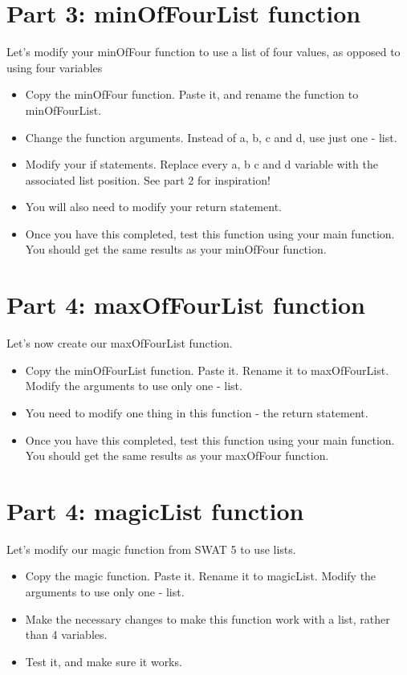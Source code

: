 \documentclass{article}
\begin{document}
\section*{Part 3: minOfFourList function}
Let's modify your minOfFour function to use a list of four values, as opposed to using four variables
\begin{itemize}
    \item Copy the minOfFour function.  Paste it, and rename the function to minOfFourList.
    \item Change the function arguments.  Instead of a, b, c and d, use just one - list.
    \item Modify your if statements.  Replace every a, b c and d variable with the associated list position.  See part 2 for inspiration!
    \item You will also need to modify your return statement.
    \item Once you have this completed, test this function using your main function.  You should get the same results as your minOfFour function.
\end{itemize}

\section*{Part 4: maxOfFourList function}
Let's now create our maxOfFourList function.
\begin{itemize}
    \item Copy the minOfFourList function.  Paste it.  Rename it to maxOfFourList.  Modify the arguments to use only one - list.
    \item You need to modify one thing in this function - the return statement.
    \item Once you have this completed, test this function using your main function.  You should get the same results as your maxOfFour function.
\end{itemize}

\section*{Part 4: magicList function}
Let's modify our magic function from SWAT 5 to use lists.
\begin{itemize}
    \item Copy the magic function.  Paste it.  Rename it to magicList.  Modify the arguments to use only one - list.
    \item Make the necessary changes to make this function work with a list, rather than 4 variables.
    \item Test it, and make sure it works.
\end{itemize}
\end{document}
